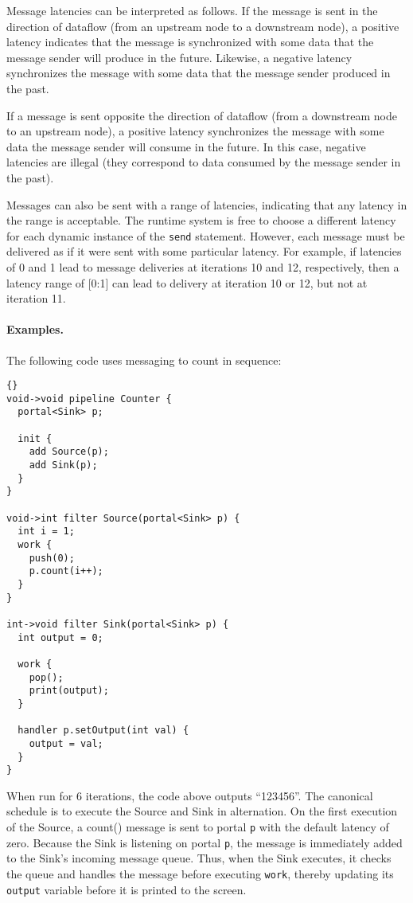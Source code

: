 Message latencies can be interpreted as follows.  If the message is
sent in the direction of dataflow (from an upstream node to a
downstream node), a positive latency indicates that the message is
synchronized with some data that the message sender will produce in
the future.  Likewise, a negative latency synchronizes the message
with some data that the message sender produced in the past.

If a message is sent opposite the direction of dataflow (from a
downstream node to an upstream node), a positive latency synchronizes
the message with some data the message sender will consume in the
future.  In this case, negative latencies are illegal (they correspond
to data consumed by the message sender in the past).

Messages can also be sent with a range of latencies, indicating that
any latency in the range is acceptable.  The runtime system is free to
choose a different latency for each dynamic instance of the
\lstinline|send| statement.  However, each message must be delivered 
as if it were sent with some particular latency.  For example, if
latencies of 0 and 1 lead to message deliveries at iterations 10 and
12, respectively, then a latency range of [0:1] can lead to delivery
at iteration 10 or 12, but not at iteration 11.

\paragraph{Examples.}

The following code uses messaging to count in sequence:

\begin{lstlisting}{}
void->void pipeline Counter {
  portal<Sink> p;

  init {
    add Source(p);
    add Sink(p);
  }
}

void->int filter Source(portal<Sink> p) {
  int i = 1;
  work {
    push(0);
    p.count(i++);
  }
}

int->void filter Sink(portal<Sink> p) {
  int output = 0;

  work {
    pop();
    print(output);
  }

  handler p.setOutput(int val) {
    output = val;
  }
}
\end{lstlisting}{}

When run for 6 iterations, the code above outputs ``123456''.  The
canonical schedule is to execute the Source and Sink in alternation.
On the first execution of the Source, a count() message is sent to
portal {\tt p} with the default latency of zero.  Because the Sink is
listening on portal {\tt p}, the message is immediately added to the
Sink's incoming message queue.  Thus, when the Sink executes, it
checks the queue and handles the message before executing {\tt work},
thereby updating its \lstinline|output| variable before it is printed
to the screen.

